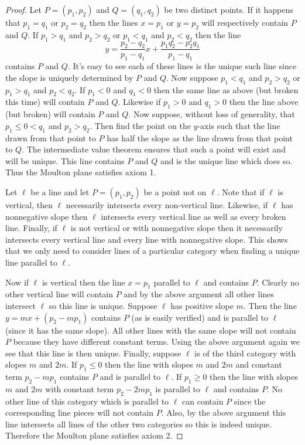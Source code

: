 \documentclass{article}
\begin{document}
\begin{proof}
Let $P = (p_1,p_2)$ and $Q = (q_1,q_2)$ be two distinct points. If it happens that $p_1 = q_1$ or $p_2 = q_2$ then the lines $x = p_1$ or $y = p_2$ will respectively contain $P$ and $Q$. If $p_1 > q_1$ and $p_2 > q_2$ or $p_1 < q_1$ and $p_2 < q_2$ then the line
\[
y = \frac{p_2-q_2}{p_1-q_1}x + \frac{p_1q_2-p_2q_1}{p_1-q_1}
\]
contains $P$ and $Q$. It's easy to see each of these lines is the unique such line since the slope is uniquely determined by $P$ and $Q$. Now suppose $p_1 < q_1$ and $p_2 > q_2$ or $p_1 > q_1$ and $p_2 < q_2$. If $p_1 < 0$ and $q_1 < 0$ then the same line as above (but broken this time) will contain $P$ and $Q$. Likewise if $p_1 > 0$ and $q_1 > 0$ then the line above (but broken) will contain $P$ and $Q$. Now suppose, without loss of generality, that $p_1 \leq 0 < q_1$ and $p_2 > q_2$. Then find the point on the $y$-axis such that the line drawn from that point to $P$ has half the slope as the line drawn from that point to $Q$. The intermediate value theorem ensures that such a point will exist and will be unique. This line contains $P$ and $Q$ and is the unique line which does so. Thus the Moulton plane satisfies axiom 1.

Let $\ell$ be a line and let $P = (p_1,p_2)$ be a point not on $\ell$. Note that if $\ell$ is vertical, then $\ell$ necessarily intersects every non-vertical line. Likewise, if $\ell$ has nonnegative slope then $\ell$ intersects every vertical line as well as every broken line. Finally, if $\ell$ is not vertical or with nonnegative slope then it necessarily intersects every vertical line and every line with nonnegative slope. This shows that we only need to consider lines of a particular category when finding a unique line parallel to $\ell$.

Now if $\ell$ is vertical then the line $x = p_1$ parallel to $\ell$ and contains $P$. Clearly no other vertical line will contain $P$ and by the above argument all other lines intersect $\ell$ so this line is unique. Suppose $\ell$ has positive slope $m$. Then the line $y = mx + (p_2-mp_1)$ contains $P$ (as is easily verified) and is parallel to $\ell$ (since it has the same slope). All other lines with the same slope will not contain $P$ because they have different constant terms. Using the above argument again we see that this line is then unique. Finally, suppose $\ell$ is of the third category with slopes $m$ and $2m$. If $p_1 \leq 0$ then the line with slopes $m$ and $2m$ and constant term $p_2-mp_1$ contains $P$ and is parallel to $\ell$. If $p_1 \geq 0$ then the line with slopes $m$ and $2m$ with constant term $p_2-2mp_1$ is parallel to $\ell$ and contains $P$. No other line of this category which is parallel to $\ell$ can contain $P$ since the corresponding line pieces will not contain $P$. Also, by the above argument this line intersects all lines of the other two categories so this is indeed unique. Therefore the Moulton plane satisfies axiom 2.


\end{proof}
\end{document}
